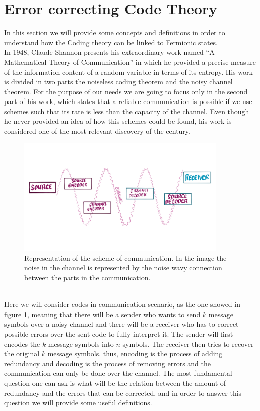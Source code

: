 \section{Error correcting Code Theory}
In this section we will provide some concepts and definitions in order to understand how the Coding theory can be linked to Fermionic states.\\
In 1948, Claude Shannon presents his extraordinary work named ``A Mathematical Theory of Communication'' \cite{shannon_mathematical_1948} in which he provided a precise measure of the information content of a random variable in terms of its entropy.  His work is divided in two parts the noiseless coding theorem and the noisy channel theorem. For the purpose of our needs we are going to focus only in the second part of his work, which states that a reliable communication is possible if we use schemes such that its rate is less than the capacity of the channel. Even though he never provided an idea of how this schemes could be found, his work is considered one of the most relevant discovery of the century.\\
\begin{figure}
\centering
\includegraphics[width=0.9\textwidth]{Figures/Source_Destination.png}
\caption{Representation of the scheme of communication. In the image the noise in the channel is represented by the noise wavy connection between the parts in the communication. }
\label{CH2:Channel_communication}
\end{figure}
\\
Here we will consider codes in communication scenario, as the one showed in figure \ref{CH2:Channel_communication}, meaning that there will be a sender who wants to send $k$ message symbols over a noisy channel and there will be a receiver who has to correct possible errors over the sent code to fully interpret it. The sender will first encodes the $k$ message symbols into $n$ symbols. The receiver then tries to recover the original $k$ message symbols. thus, encoding is the process of adding redundancy and decoding is the process of removing errors and the communication can only be done over the channel. The most fundamental question one can ask is what will be the relation between the amount of redundancy and the errors that can be corrected, and in order to answer this question we will provide some useful definitions.\\

